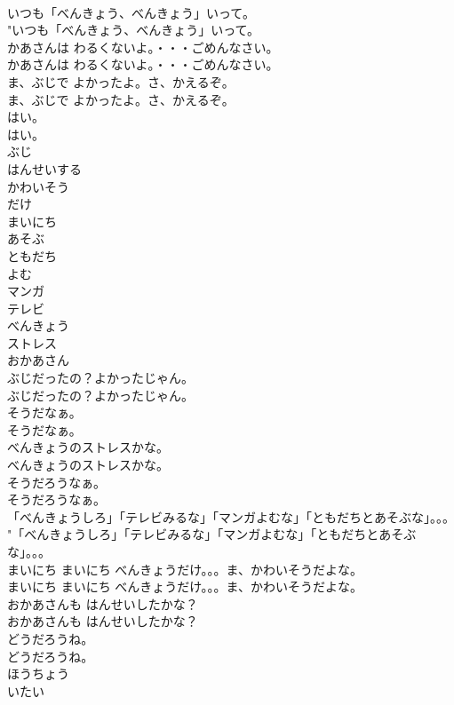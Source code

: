 \documentclass[8pt]{extreport}
\begin{document}
\begin{CJK}{UTF8}{min}
\\	いつも「べんきょう、べんきょう」いって。	
\\	"いつも「べんきょう、べんきょう」いって。 
\\	かあさんは わるくないよ。・・・ごめんなさい。	
\\	かあさんは わるくないよ。・・・ごめんなさい。 
\\	ま、ぶじで よかったよ。さ、かえるぞ。	
\\	ま、ぶじで よかったよ。さ、かえるぞ。 
\\	はい。	
\\	はい。 
\\	ぶじ
\\	はんせいする
\\	かわいそう
\\	だけ
\\	まいにち
\\	あそぶ
\\	ともだち
\\	よむ
\\	マンガ
\\	テレビ
\\	べんきょう
\\	ストレス
\\	おかあさん
\\	ぶじだったの？よかったじゃん。	
\\	ぶじだったの？よかったじゃん。 
\\	そうだなぁ。	
\\	そうだなぁ。 
\\	べんきょうのストレスかな。	
\\	べんきょうのストレスかな。 
\\	そうだろうなぁ。	
\\	そうだろうなぁ。 
\\	「べんきょうしろ」「テレビみるな」「マンガよむな」「ともだちとあそぶな」。。。	
\\	"「べんきょうしろ」「テレビみるな」「マンガよむな」「ともだちとあそぶな」。。。 
\\	まいにち まいにち べんきょうだけ。。。ま、かわいそうだよな。	
\\	まいにち まいにち べんきょうだけ。。。ま、かわいそうだよな。 
\\	おかあさんも はんせいしたかな？	
\\	おかあさんも はんせいしたかな？ 
\\	どうだろうね。	
\\	どうだろうね。 
\\	ほうちょう
\\	いたい

\end{CJK}
\end{document}
